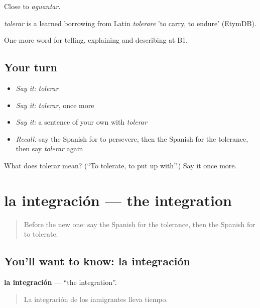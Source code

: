 Close to \emph{aguantar}.

\begin{cousinweb}
\emph{tolerar} is a learned borrowing from Latin \emph{tolerare} 'to carry, to endure' (EtymDB).
\end{cousinweb}

\begin{grammarlens}[title={What you've built}]
One more word for telling, explaining and describing at B1.
\end{grammarlens}

\subsection*{Your turn}
\begin{itemize}
\raggedright
  \item \emph{Say it:} \emph{tolerar}
  \item \emph{Say it:} \emph{tolerar}, once more
  \item \emph{Say it:} a sentence of your own with \emph{tolerar}
  \item \emph{Recall:} say the Spanish for to persevere, then the Spanish for the tolerance, then say \emph{tolerar} again
\end{itemize}

\begin{tcolorbox}[breakable,colback=teal!4,colframe=teal!35!black,title={Before you move on}]
What does tolerar mean? (\textquotedblleft{}To tolerate, to put up with\textquotedblright{}.) Say it once more.
\end{tcolorbox}
\section[la integración]{la integración — the integration}

\label{lesson:ES-C610-integracion}



\begin{quote}
Before the new one: say the Spanish for the tolerance, then the Spanish for to tolerate.
\end{quote}

\subsection*{You'll want to know: la integración}
\textbf{la integración} — \textquotedblleft{}the integration\textquotedblright{}.

\begin{quote}
La integración de los inmigrantes lleva tiempo.
\end{quote}

